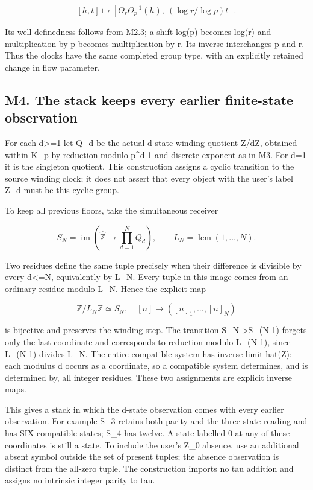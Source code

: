\documentclass[
]{article}
\begin{document}
\[
[h,t]\longmapsto
[\Theta_r\Theta_p^{-1}(h),\ (\log r/\log p)t].
\tag{M3.4}
\]

Its well-definedness follows from M2.3; a shift log(p) becomes log(r)
and multiplication by p becomes multiplication by r. Its inverse
interchanges p and r. Thus the clocks have the same completed group
type, with an explicitly retained change in flow parameter.

\subsection{M4. The stack keeps every earlier finite-state
observation}\label{m4.-the-stack-keeps-every-earlier-finite-state-observation}

For each d\textgreater=1 let Q\_d be the actual d-state winding quotient
Z/dZ, obtained within K\_p by reduction modulo p\^{}d-1 and discrete
exponent as in M3. For d=1 it is the singleton quotient. This
construction assigns a cyclic transition to the source winding clock; it
does not assert that every object with the user's label Z\_d must be
this cyclic group.

To keep all previous floors, take the simultaneous receiver

\[
S_N=\operatorname{im}\left(\widehat{\mathbb Z}
\longrightarrow\prod_{d=1}^N Q_d\right),\qquad
L_N=\operatorname{lcm}(1,\ldots,N).
\tag{M4.1}
\]

Two residues define the same tuple precisely when their difference is
divisible by every d\textless=N, equivalently by L\_N. Every tuple in
this image comes from an ordinary residue modulo L\_N. Hence the
explicit map

\[
\mathbb Z/L_N\mathbb Z\simeq S_N,\quad
[n]\longmapsto([n]_1,\ldots,[n]_N)
\tag{M4.2}
\]

is bijective and preserves the winding step. The transition
S\_N-\textgreater S\_(N-1) forgets only the last coordinate and
corresponds to reduction modulo L\_(N-1), since L\_(N-1) divides L\_N.
The entire compatible system has inverse limit hat(Z): each modulus d
occurs as a coordinate, so a compatible system determines, and is
determined by, all integer residues. These two assignments are explicit
inverse maps.

This gives a stack in which the d-state observation comes with every
earlier observation. For example S\_3 retains both parity and the
three-state reading and has SIX compatible states; S\_4 has twelve. A
state labelled 0 at any of these coordinates is still a state. To
include the user's Z\_0 absence, use an additional absent symbol outside
the set of present tuples; the absence observation is distinct from the
all-zero tuple. The construction imports no tau addition and assigns no
intrinsic integer parity to tau.
\end{document}
